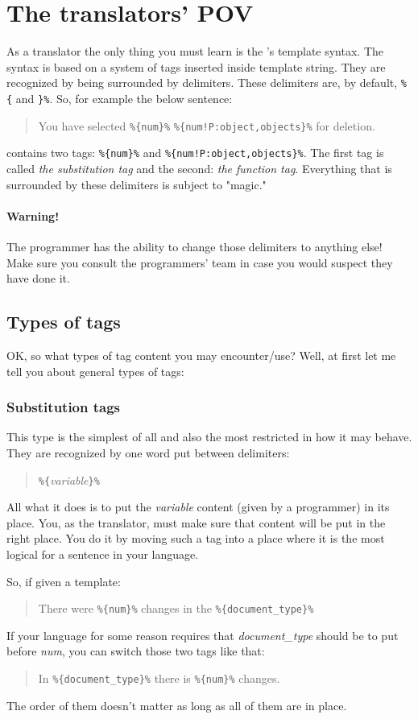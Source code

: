 \section{The translators' POV}\label{transPOV}

As a translator the only thing you must learn is the \mulan{}'s template syntax. 
The syntax is based on a system of tags inserted inside template string. They are recognized by being surrounded by delimiters.
These delimiters are, by default, \verb+%{+ and \verb+}%+. So, for example the below sentence:
\begin{quote}
	You have selected \verb+%{num}%+ \verb+%{num!P:object,objects}%+ for deletion.
\end{quote}
contains two tags: \verb+%{num}%+ and \verb+%{num!P:object,objects}%+. 
The first tag is called \emph{the substitution tag} and the second: \emph{the function tag}.
Everything that is surrounded by these delimiters is subject to \mulan{} "magic."

\paragraph{Warning!} The programmer has the ability to change those delimiters to anything else! Make sure you consult the programmers' team in case you would suspect they have done it.

\subsection{Types of tags}
OK, so what types of tag content you may encounter/use?
Well, at first let me tell you about general types of tags:
\subsubsection{Substitution tags}
This type is the simplest of all and also the most restricted in how it may behave. 
They are recognized by one word put between delimiters:
\begin{quote}
	\verb+%{+\textit{variable}\verb+}%+
\end{quote}
All what it does is to put the \textit{variable} content (given by a programmer) in its place.
You, as the translator, must make sure that content will be put in the right place. You do it by moving such a tag into a place where it is the most logical for a sentence in your language.

So, if given a template:\begin{quote}
	There were \verb+%{num}%+ changes in the \verb+%{document_type}%+
\end{quote}
If your language for some reason requires that \textit{document\_type} should be to put before \textit{num}, you can switch those two tags like that:\begin{quote}
	In \verb+%{document_type}%+ there is \verb+%{num}%+ changes.
\end{quote}
 The order of them doesn't matter as long as all of them are in place.

